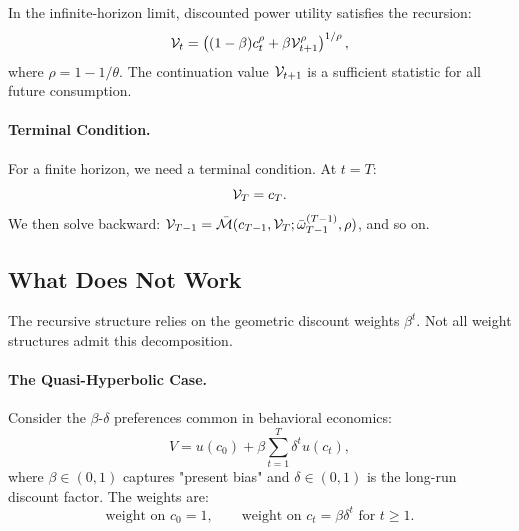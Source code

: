 \begin{proposition}
\label{prop:recursive-utility}
In the infinite-horizon limit, discounted power utility satisfies the recursion:
\begin{equation}
\mathcal{V}_t = \left( (1-\beta) c_t^\rho + \beta \mathcal{V}_{t+1}^\rho \right)^{1/\rho},
\end{equation}
where $\rho = 1 - 1/\theta$. The continuation value $\mathcal{V}_{t+1}$ is a sufficient statistic for all future consumption.
\end{proposition}

\paragraph{Terminal Condition.}
For a finite horizon, we need a terminal condition. At $t = T$:
\begin{equation}
\mathcal{V}_T = c_T.
\label{eq:terminal}
\end{equation}
We then solve backward: $\mathcal{V}_{T-1} = \bar{\mathcal{M}}(c_{T-1}, \mathcal{V}_T; \bar{\omega}_{T-1}^{(T-1)}, \rho)$, and so on.

\subsection{What Does Not Work}
\label{subsec:what-does-not-work}

The recursive structure relies on the geometric discount weights $\beta^t$. Not all weight structures admit this decomposition.

\paragraph{The Quasi-Hyperbolic Case.}
Consider the $\beta$-$\delta$ preferences common in behavioral economics:
\begin{equation}
V = u(c_0) + \beta \sum_{t=1}^{T} \delta^t u(c_t),
\label{eq:beta-delta}
\end{equation}
where $\beta \in (0,1)$ captures "present bias" and $\delta \in (0,1)$ is the long-run discount factor. The weights are:
\begin{equation}
\text{weight on } c_0 = 1, \qquad \text{weight on } c_t = \beta \delta^t \text{ for } t \geq 1.
\label{eq:beta-delta-weights}
\end{equation}

